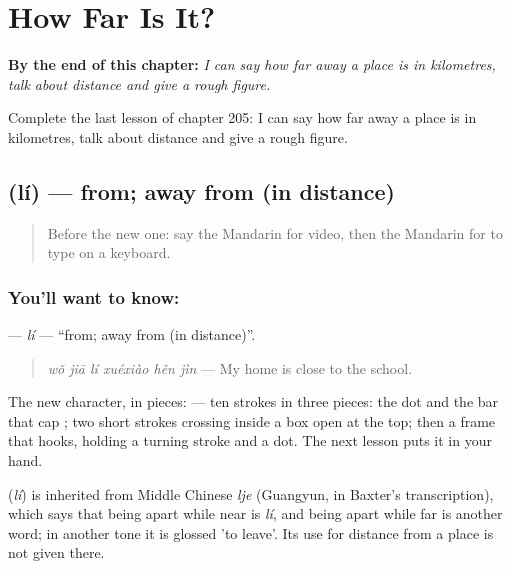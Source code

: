 
\chapter{How Far Is It?}
\label{ch:zh-how-far-is-it}

\begin{chapteropening}
\textbf{By the end of this chapter:} \emph{I can say how far away a place is in kilometres, talk about distance and give a rough figure.}

Complete the last lesson of chapter 205: I can say how far away a place is in kilometres, talk about distance and give a rough figure.
\end{chapteropening}

\section[\texorpdfstring{\zh{离} (lí)}{离 (lí)}]{ (lí) — from; away from (in distance)}

\label{lesson:ZH-C205-li}



\begin{quote}
Before the new one: say the Mandarin for video, then the Mandarin for to type on a keyboard.
\end{quote}

\subsection*{You'll want to know: }
\textbf{} — \emph{lí} — \textquotedblleft{}from; away from (in distance)\textquotedblright{}.

\begin{quote}
\emph{wǒ jiā lí xuéxiào hěn jìn} — My home is close to the school.
\end{quote}

The new character, in pieces:  — ten strokes in three pieces: the dot and the bar that cap ; two short strokes crossing inside a box open at the top; then a frame that hooks, holding a turning stroke and a dot. The next lesson puts it in your hand.

\begin{cousinweb}
\textbf{} (\emph{lí}) is inherited from Middle Chinese \emph{lje} (Guangyun, in Baxter's transcription), which says that being apart while near is \emph{lí}, and being apart while far is another word; in another tone it is glossed 'to leave'. Its use for distance from a place is not given there.
\end{cousinweb}


